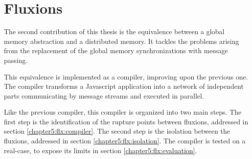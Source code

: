\section{Fluxions} \label{chapter5:flx}


The second contribution of this thesis is the equivalence between a global memory abstraction and a distributed memory.
It tackles the problems arising from the replacement of the global memory synchronizations with message passing.

This equivalence is implemented as a compiler, improving upon the previous one.
The compiler transforms a Javascript application into a network of independent parts communicating by message streams and executed in parallel.

Like the previous compiler, this compiler is organized into two main steps.
The first step is the identification of the rupture points between fluxions, addressed in section \ref{chapter5:flx:compiler}.
The second step is the isolation between the fluxions, addressed in section \ref{chapter5:flx:isolation}.
The compiler is tested on a real-case, to expose its limits in section \ref{chapter5:flx:evaluation}.






